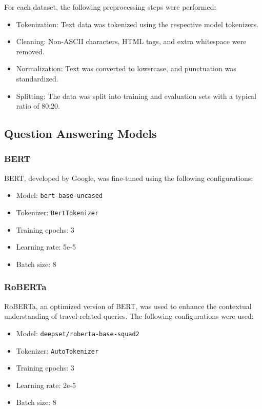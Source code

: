 \documentclass[conference]{IEEEtran}
\begin{document}
For each dataset, the following preprocessing steps were performed:
\begin{itemize}
    \item Tokenization: Text data was tokenized using the respective model tokenizers.
    \item Cleaning: Non-ASCII characters, HTML tags, and extra whitespace were removed.
    \item Normalization: Text was converted to lowercase, and punctuation was standardized.
    \item Splitting: The data was split into training and evaluation sets with a typical ratio of 80:20.
\end{itemize}

    \subsection{Question Answering Models}

        \subsubsection{BERT}

            BERT, developed by Google, was fine-tuned using the following configurations:
            \begin{itemize}
                \item Model: \texttt{bert-base-uncased}
                \item Tokenizer: \texttt{BertTokenizer}
                \item Training epochs: 3
                \item Learning rate: 5e-5
                \item Batch size: 8
            \end{itemize}

        \subsubsection{RoBERTa}

            RoBERTa, an optimized version of BERT, was used to enhance the contextual understanding of travel-related queries. The following configurations were used:
            \begin{itemize}
                \item Model: \texttt{deepset/roberta-base-squad2}
                \item Tokenizer: \texttt{AutoTokenizer}
                \item Training epochs: 3
                \item Learning rate: 2e-5
                \item Batch size: 8
            \end{itemize}
\end{document}
